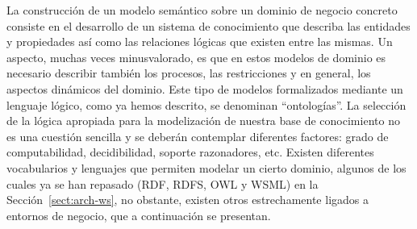 La construcción de un modelo semántico sobre un dominio de negocio concreto
consiste en el desarrollo de un sistema de conocimiento que describa las
entidades y propiedades así como las relaciones lógicas que existen entre
las mismas. Un aspecto, muchas veces minusvalorado, es que en estos modelos de
dominio es necesario describir también los procesos, las restricciones y en
general, los aspectos dinámicos del dominio. Este tipo de modelos formalizados
mediante un lenguaje lógico, como ya hemos descrito, se denominan ``ontologías''. La selección de la lógica apropiada para la modelización de nuestra base de
conocimiento no es una cuestión sencilla y se deberán contemplar diferentes
factores: grado de computabilidad, decidibilidad, soporte razonadores, etc. Existen
diferentes vocabularios y lenguajes que permiten modelar un cierto dominio, algunos
de los cuales ya se han repasado (\gls{RDF}, RDFS, \gls{OWL} y \gls{WSML}) en la Sección~\ref{sect:arch-ws}, no obstante, existen otros estrechamente
ligados a entornos de negocio, que a continuación se presentan.


